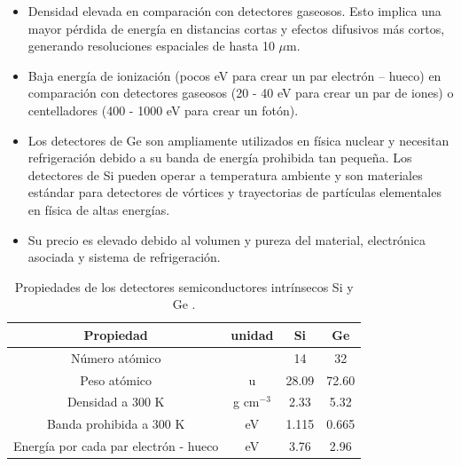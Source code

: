 \begin{itemize}
\item Densidad elevada en comparación con detectores gaseosos. Esto implica una mayor pérdida de energía en distancias cortas y efectos difusivos más cortos, generando resoluciones espaciales de hasta 10 $\mu$m.
\item Baja energía de ionización (pocos eV para crear un par electrón – hueco) en comparación con detectores gaseosos (20 - 40 eV para crear un par de iones) o centelladores (400 - 1000 eV para crear un fotón).
\item Los detectores de Ge son ampliamente utilizados en física nuclear y necesitan refrigeración debido a su banda de energía prohibida tan pequeña. Los detectores de Si pueden operar a temperatura ambiente y son materiales estándar para detectores de vórtices y trayectorias de partículas elementales en física de altas energías.
\item Su precio es elevado debido al volumen y pureza del material, electrónica asociada y sistema de refrigeración.
\end{itemize}
\begin{table}[h]
 \centering
 \caption{Propiedades de los detectores semiconductores intrínsecos Si y Ge \cite{bertolini1968semiconductor}.}\label{Table-PropiedadesSiGEe}
 \begin{tabular}{|c|c|c|c|}\hline
\rowcolor{Blue2} Propiedad & unidad & Si & Ge \\ \hline
\rowcolor{Blue1} Número atómico & & 14 & 32 \\
\rowcolor{Blue1} Peso atómico & u & 28.09 & 72.60 \\
\rowcolor{Blue1} Densidad a 300 K & g cm$^{-3}$ & 2.33 & 5.32 \\
\rowcolor{Blue1} Banda prohibida a 300 K & eV & 1.115 & 0.665 \\
\rowcolor{Blue1} Energía por cada par electrón - hueco & eV & 3.76 & 2.96 \\ \hline
 \end{tabular}
\end{table}
